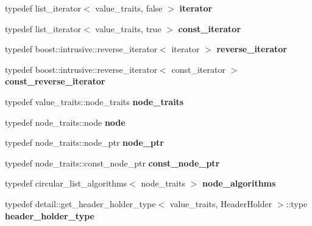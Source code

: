 \begin{DoxyCompactItemize}
typedef list\+\_\+iterator$<$ value\+\_\+traits, false $>$ {\bfseries iterator}
\item 
\mbox{\label{classboost_1_1intrusive_1_1list__impl_af4ced710fe02662c5650d161af83d8cd}} 
typedef list\+\_\+iterator$<$ value\+\_\+traits, true $>$ {\bfseries const\+\_\+iterator}
\item 
\mbox{\label{classboost_1_1intrusive_1_1list__impl_aed95b235a2056faa7d2f8cbd58dcfeb7}} 
typedef boost\+::intrusive\+::reverse\+\_\+iterator$<$ iterator $>$ {\bfseries reverse\+\_\+iterator}
\item 
\mbox{\label{classboost_1_1intrusive_1_1list__impl_a00a0933ca1d92836a220a604e521d9c4}} 
typedef boost\+::intrusive\+::reverse\+\_\+iterator$<$ const\+\_\+iterator $>$ {\bfseries const\+\_\+reverse\+\_\+iterator}
\item 
\mbox{\label{classboost_1_1intrusive_1_1list__impl_ae96503e0398292d5763e84a6baf677ba}} 
typedef value\+\_\+traits\+::node\+\_\+traits {\bfseries node\+\_\+traits}
\item 
\mbox{\label{classboost_1_1intrusive_1_1list__impl_aaaa96a7e3013b33e4da86a3725352844}} 
typedef node\+\_\+traits\+::node {\bfseries node}
\item 
\mbox{\label{classboost_1_1intrusive_1_1list__impl_a1b1b1d87a4edc6bfee4e43622184e689}} 
typedef node\+\_\+traits\+::node\+\_\+ptr {\bfseries node\+\_\+ptr}
\item 
\mbox{\label{classboost_1_1intrusive_1_1list__impl_a1bdb914613818a3acb6866cdba10ff09}} 
typedef node\+\_\+traits\+::const\+\_\+node\+\_\+ptr {\bfseries const\+\_\+node\+\_\+ptr}
\item 
\mbox{\label{classboost_1_1intrusive_1_1list__impl_ad71774881b8a43de5d41e39af79afcaf}} 
typedef circular\+\_\+list\+\_\+algorithms$<$ node\+\_\+traits $>$ {\bfseries node\+\_\+algorithms}
\item 
\mbox{\label{classboost_1_1intrusive_1_1list__impl_abd98fa5c33715ec93ec42f3b5755b87b}} 
typedef detail\+::get\+\_\+header\+\_\+holder\+\_\+type$<$ value\+\_\+traits, Header\+Holder $>$\+::type {\bfseries header\+\_\+holder\+\_\+type}
\end{DoxyCompactItemize}
